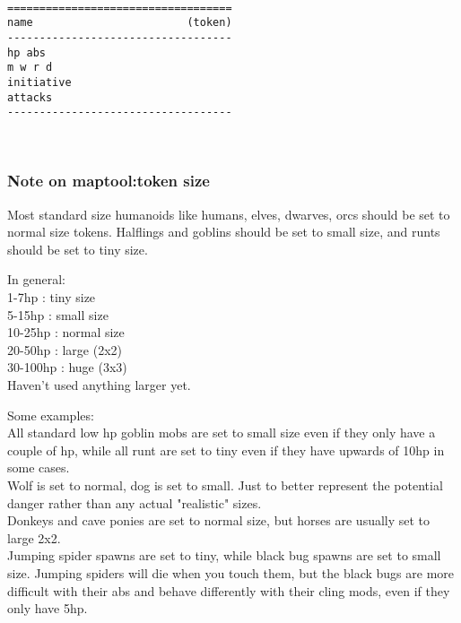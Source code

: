 \

\pagebreak[1]
\tiny \begin{samepage} \begin{verbatim}
===================================
name                        (token)
-----------------------------------
hp abs
m w r d
initiative
attacks
-----------------------------------
\end{verbatim} \end{samepage} \normalsize

\





\subsubsection*{Note on maptool:token size}
Most standard size humanoids like humans, elves, dwarves, orcs should be set to  normal size tokens. Halflings and goblins should be set to small size, and runts should be set to tiny size.

In general:\\
1-7hp : tiny size \\
5-15hp : small size \\
10-25hp : normal size \\
20-50hp : large (2x2) \\
30-100hp : huge (3x3) \\
Haven't used anything larger yet.

Some examples:\\
All standard low hp goblin mobs are set to small size even if they only have a couple of hp, while all runt are set to tiny even if they have upwards of 10hp in some cases.\\
Wolf is set to normal, dog is set to small. Just to better represent the potential danger rather than any actual "realistic" sizes.\\
Donkeys and cave ponies are set to normal size, but horses are usually set to large 2x2.\\
Jumping spider spawns are set to tiny, while black bug spawns are set to small size. Jumping spiders will die when you touch them, but the black bugs are more difficult with their abs and behave differently with their cling mods, even if they only have 5hp.

\






